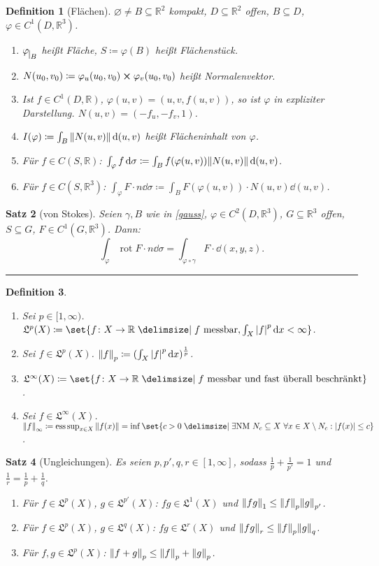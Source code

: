 \documentclass[a4paper]{article}
\newcounter{Sec}
\theoremstyle{marginbreak}
\newtheorem{definition}{Definition}[Sec]
\newtheorem{satz}[definition]{Satz}
\newcommand{\sep}{%
	\rule{\textwidth}{0.3pt}%
	\stepcounter{Sec}%
	}
\newcommand{\R}{\mathbb{R}}
\renewcommand{\L}[1]{\mathfrak{L}^{#1}(X)}
\DeclareMathOperator{\rot}{rot}
\DeclareMathOperator*{\esssup}{ess\,sup}
\newcommand\restr[2]{{#1_{\mkern 1mu \vrule height 2ex\mkern2mu #2}}}
\begin{document}
	\begin{definition}[Flächen]
		$\varnothing\neq B\subseteq \R^2$ kompakt, $D\subseteq\R^2$ offen, $B\subseteq D$,
		$\varphi\in C^1(D,\R^3)$.
		\begin{enumerate}[label=(\alph*)]
			\item $\restr{\varphi}{B}$ heißt Fläche, $S\coloneqq\varphi(B)$ heißt Flächenstück.
			\item $N(u_0, v_0)\coloneqq \varphi_u(u_0, v_0)\cross\varphi_v(u_0, v_0)$ heißt Normalenvektor.
			\item Ist $f\in C^1(D,\R)$, $\varphi(u, v) = (u, v, f(u, v))$, so ist $\varphi$ in expliziter Darstellung. $N(u, v) = (-f_u, -f_v, 1)$.
			\item $I(\varphi)\coloneqq\int_B\norm{N(u, v)}\dd{(u, v)}$ heißt Flächeninhalt von $\varphi$.
			\item Für $f\in C(S,\R)$: $\int_\varphi f\dd{\sigma}\coloneqq\int_B f(\varphi(u, v))\norm{N(u, v)}\dd{(u, v)}$.
			\item Für $f\in C(S,\R^3)$: $\int_\varphi F\cdot n\dd{\sigma}\coloneqq\int_BF(\varphi(u, v))\cdot N(u, v)\dd{(u, v)}$.
		\end{enumerate}
	\end{definition}
	\begin{satz}[von Stokes]
		Seien $\gamma, B$ wie in \ref{gauss}, $\varphi\in C^2(D,\R^3)$, $G\subseteq\R^3$ offen, $S\subseteq G$, $F\in C^1(G,\R^3)$. Dann:
		\[
			\int_\varphi \rot F\cdot n\dd{\sigma} = \int_{\varphi\circ\gamma}F\cdot\dd{(x, y, z)}.
		\]
	\end{satz}
	\sep
	\begin{definition}
		\begin{enumerate}[label=(\alph*)]
			\item Sei $p\in[1,\infty)$. $\L{p}\coloneqq\set{f\colon X\to\R\given f~\text{messbar}, \int_X\abs{f}^p\dd{x}<\infty}$.
			\item Sei $f\in\L{p}$. $\norm{f}_p\coloneqq (\int_X\abs{f}^p\dd{x})^\frac{1}{p}$.
			\item $\L{\infty}\coloneqq\set{f\colon X\to\R\given f~\text{messbar und fast überall beschränkt}}$.
			\item Sei $f\in\L{\infty}$. $\norm{f}_\infty\coloneqq \esssup_{x\in X}\norm{f(x)}
				= \inf\set{c>0\given\exists\text{NM}~N_c\subseteq X~\forall x\in X\setminus N_c:\abs{f(x)}\leq c}$.
		\end{enumerate}
	\end{definition}
	\begin{satz}[Ungleichungen]
		Es seien $p, p', q, r\in[1,\infty]$, sodass $\frac{1}{p}+\frac{1}{p'}=1$ und $\frac{1}{r}=\frac{1}{p}+\frac{1}{q}$.
		\begin{enumerate}[label=(\alph*)]
			\item Für $f\in\L{p}$, $g\in\L{p'}$: $fg\in\L{1}$ und $\norm{fg}_1\leq\norm{f}_p\norm{g}_{p'}$.
			\item Für $f\in\L{p}$, $g\in\L{q}$: $fg\in\L{r}$ und $\norm{fg}_r\leq\norm{f}_p\norm{g}_q$.
			\item Für $f,g\in\L{p}$: $\norm{f+g}_p\leq\norm{f}_p+\norm{g}_p$.
		\end{enumerate}
	\end{satz}
\end{document}
